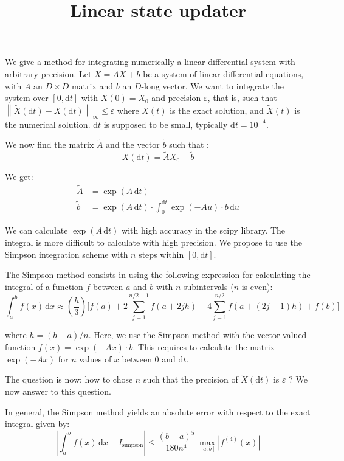 \documentclass[a4paper]{article}
\title{Linear state updater}
\author{}
\newcommand{\dt}{\mathrm{d}t}
\newcommand{\dx}{\mathrm{d}x}
\newcommand{\norminf}[1]{\left\| #1 \right\|_\infty}
\newcommand{\eps}{\varepsilon}
\begin{document}
\maketitle

We give a method for integrating numerically a linear differential system
with arbitrary precision. Let $\dot X = AX+b$ be a system of linear differential
equations, with $A$ an $D \times D$ matrix and $b$ an $D$-long vector.
We want to integrate the system over $[0,\dt]$ with $X(0) = X_0$ and precision
$\eps$, that is, such that $\norminf{\widetilde X(\dt)-X(\dt)} \leq \eps$ where
$X(t)$ is the exact solution, and $\widetilde X(t)$ is the numerical solution.
$\dt$ is supposed to be small, typically $\dt = 10^{-4}$.

We now find the matrix $\widetilde A$ and the vector $\widetilde b$ such that :
\begin{equation}
X(\dt) = \widetilde A X_0 + \widetilde b
\end{equation}

We get:
\begin{align}
\widetilde A &= \exp(A \,\dt)\\
\widetilde b &= \exp(A \,\dt) \cdot \int_0^{\dt} \exp(-A u) \cdot b \, \mathrm{d}u
\end{align}

We can calculate $\exp(A \, \dt)$ with high accuracy in the scipy library. 
The integral is more difficult to calculate with high precision. We propose
to use the Simpson integration scheme with $n$ steps within $[0,\dt]$.

The Simpson method consists in using the following expression for calculating
the integral of a function $f$ between $a$ and $b$ with $n$ subintervals ($n$ is even):
\begin{equation}
\int_a^b f(x) \, \dx\approx 
\left(\frac{h}{3}\right) \bigg[f(a)+2\sum_{j=1}^{n/2-1}f(a+2jh)+
4\sum_{j=1}^{n/2}f(a+(2j-1)h)+f(b)
\bigg]
\end{equation}

\noindent where $h = (b-a)/n$. Here, we use the Simpson method with the vector-valued function $f(x) = \exp(-A x) \cdot b$.
This requires to calculate the matrix $\exp(-A x)$ for $n$ values of $x$ between $0$ and $\dt$.

The question is now: how to chose $n$ such that the precision of $\widetilde X(\dt)$ is 
$\eps$ ?
We now answer to this question.

In general, the Simpson method yields an absolute error with respect to the exact integral 
given by:
\begin{equation}
\left| \int_a^b f(x) \, \dx - I_{\textrm{simpson}} \right| \leq
\frac{(b-a)^5}{180 n^4} \, \max_{[a,b]} |f^{(4)}(x)|
\end{equation}
\end{document}
